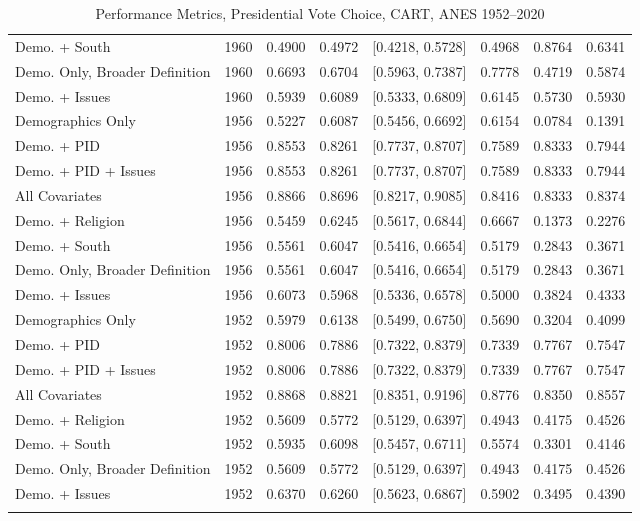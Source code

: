 \begin{longtable}{lrrrlrrr}
  Demo. + South & 1960 & 0.4900 & 0.4972 & [0.4218, 0.5728] & 0.4968 & 0.8764 & 0.6341 \\ 
  Demo. Only, Broader Definition & 1960 & 0.6693 & 0.6704 & [0.5963, 0.7387] & 0.7778 & 0.4719 & 0.5874 \\ 
  Demo. + Issues & 1960 & 0.5939 & 0.6089 & [0.5333, 0.6809] & 0.6145 & 0.5730 & 0.5930 \\ 
  Demographics Only & 1956 & 0.5227 & 0.6087 & [0.5456, 0.6692] & 0.6154 & 0.0784 & 0.1391 \\ 
  Demo. + PID & 1956 & 0.8553 & 0.8261 & [0.7737, 0.8707] & 0.7589 & 0.8333 & 0.7944 \\ 
  Demo. + PID + Issues & 1956 & 0.8553 & 0.8261 & [0.7737, 0.8707] & 0.7589 & 0.8333 & 0.7944 \\ 
  All Covariates & 1956 & 0.8866 & 0.8696 & [0.8217, 0.9085] & 0.8416 & 0.8333 & 0.8374 \\ 
  Demo. + Religion & 1956 & 0.5459 & 0.6245 & [0.5617, 0.6844] & 0.6667 & 0.1373 & 0.2276 \\ 
  Demo. + South & 1956 & 0.5561 & 0.6047 & [0.5416, 0.6654] & 0.5179 & 0.2843 & 0.3671 \\ 
  Demo. Only, Broader Definition & 1956 & 0.5561 & 0.6047 & [0.5416, 0.6654] & 0.5179 & 0.2843 & 0.3671 \\ 
  Demo. + Issues & 1956 & 0.6073 & 0.5968 & [0.5336, 0.6578] & 0.5000 & 0.3824 & 0.4333 \\ 
  Demographics Only & 1952 & 0.5979 & 0.6138 & [0.5499, 0.6750] & 0.5690 & 0.3204 & 0.4099 \\ 
  Demo. + PID & 1952 & 0.8006 & 0.7886 & [0.7322, 0.8379] & 0.7339 & 0.7767 & 0.7547 \\ 
  Demo. + PID + Issues & 1952 & 0.8006 & 0.7886 & [0.7322, 0.8379] & 0.7339 & 0.7767 & 0.7547 \\ 
  All Covariates & 1952 & 0.8868 & 0.8821 & [0.8351, 0.9196] & 0.8776 & 0.8350 & 0.8557 \\ 
  Demo. + Religion & 1952 & 0.5609 & 0.5772 & [0.5129, 0.6397] & 0.4943 & 0.4175 & 0.4526 \\ 
  Demo. + South & 1952 & 0.5935 & 0.6098 & [0.5457, 0.6711] & 0.5574 & 0.3301 & 0.4146 \\ 
  Demo. Only, Broader Definition & 1952 & 0.5609 & 0.5772 & [0.5129, 0.6397] & 0.4943 & 0.4175 & 0.4526 \\ 
  Demo. + Issues & 1952 & 0.6370 & 0.6260 & [0.5623, 0.6867] & 0.5902 & 0.3495 & 0.4390 \\ 
   \bottomrule
\caption{Performance Metrics, Presidential Vote Choice, CART, ANES 1952--2020} 
\label{tab:ANES_prezvote_cart}
\end{longtable}
